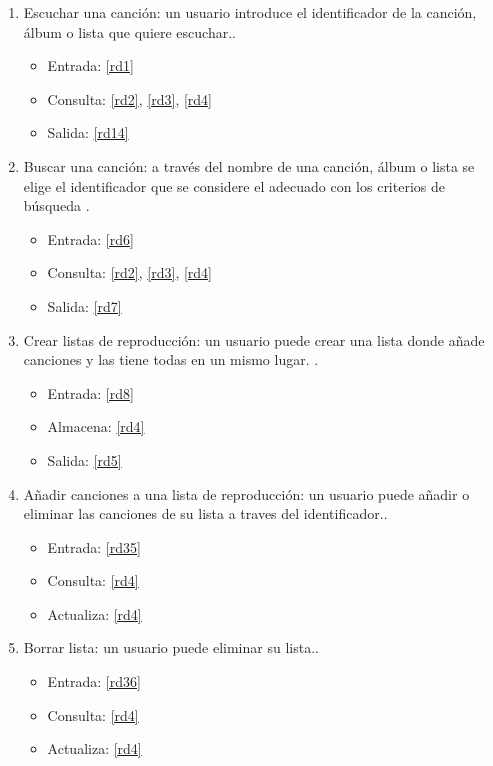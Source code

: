 \documentclass[12pt,a4paper]{article}
\begin{document}
\begin{enumerate}[label=\textnormal{RF\arabic*}]


    \item Escuchar una canción: un usuario introduce el identificador de la canción, álbum o lista que quiere escuchar.\label{rf1}.
    	\begin{itemize}
			\item Entrada: \ref{rd1}
			\item Consulta: \ref{rd2}, \ref{rd3}, \ref{rd4} 
			\item Salida: \ref{rd14}
		\end{itemize}
		
	 \item Buscar una canción: a través del nombre de una canción, álbum o lista se elige el identificador que se considere el adecuado con los criterios de búsqueda \label{rf2}.
    	\begin{itemize}
			\item Entrada: \ref{rd6}
			\item Consulta: \ref{rd2}, \ref{rd3}, \ref{rd4} 
			\item Salida: \ref{rd7}
		\end{itemize}

	 \item Crear listas de reproducción: un usuario puede crear una lista donde añade canciones y las tiene todas en un mismo lugar. \label{rf3}.
    	\begin{itemize}
			\item Entrada: \ref{rd8}
			\item Almacena: \ref{rd4}
			\item Salida: \ref{rd5}
		\end{itemize}

	 \item Añadir canciones a una lista de reproducción: un usuario puede añadir o eliminar las canciones de su lista a traves del identificador.\label{rf4}.
    	\begin{itemize}
			\item Entrada: \ref{rd35}
			\item Consulta: \ref{rd4}
			\item Actualiza: \ref{rd4}
		\end{itemize}

	 \item Borrar lista: un usuario puede eliminar su lista.\label{rf5}.
    	\begin{itemize}
			\item Entrada: \ref{rd36}
			\item Consulta: \ref{rd4}
			\item Actualiza: \ref{rd4}
		\end{itemize}
		

\end{enumerate}
\end{document}
